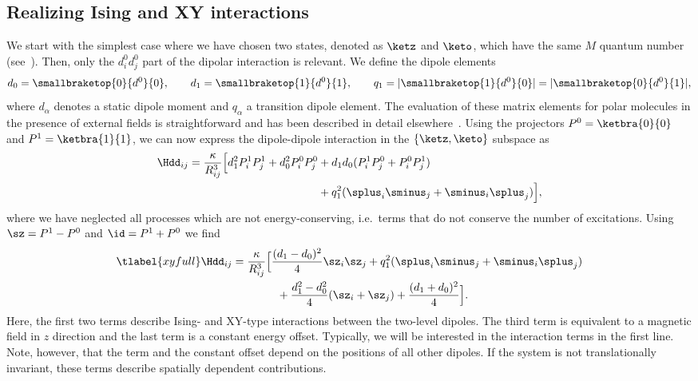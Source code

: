 \subsection{Realizing Ising and XY interactions}
We start with the simplest case where we have chosen two states, denoted as $\ketz$ and $\keto$, which have the same $M$ quantum number (see~).
Then, only the $d^0_id^0_j$ part of the dipolar interaction is relevant.
We define the dipole elements
\begin{align}
    d_0 = \smallbraketop{0}{d^0}{0},\qquad
    d_1 = \smallbraketop{1}{d^0}{1},\qquad
    q_1 = |\smallbraketop{1}{d^0}{0}| = |\smallbraketop{0}{d^0}{1}|,
\end{align}
where $d_\alpha$ denotes a static dipole moment and $q_\alpha$ a transition dipole element.
The evaluation of these matrix elements for polar molecules in the presence of external fields is straightforward and has been described in detail elsewhere~\cite{Micheli2007}.
Using the projectors $P^0 = \ketbra{0}{0}$ and $P^1 = \ketbra{1}{1}$, we can now express the
dipole-dipole interaction  in the $\{\ketz, \keto\}$ subspace as
\begin{align}
    \Hdd_{ij} = \frac{\kappa}{R_{ij}^3} \Big[ d_1^2 P^1_i P^1_j + d_0^2 P^0_i P^0_j &+ d_1d_0 (P^1_i P^0_j + P^0_i P^1_j) \\
              &+ q_1^2 (\splus_i \sminus_j + \sminus_i \splus_j) \Big],
\end{align}
where we have neglected all processes which are not energy-conserving,
i.e.~terms that do not conserve the number of excitations.
Using $\sz = P^1 - P^0$ and $\id = P^1 + P^0$ we find
\begin{align} \tlabel{xyfull}
    \Hdd_{ij} &= \frac{\kappa}{R_{ij}^3} \Big[ \frac{(d_1-d_0)^2}{4} \sz_i \sz_j  + q_1^2 (\splus_i \sminus_j + \sminus_i \splus_j)\\
              &\qquad\qquad + \frac{d_1^2 - d_0^2}{4} (\sz_i + \sz_j)  + \frac{(d_1+d_0)^2}{4} \Big].
\end{align}
Here, the first two terms describe Ising- and XY-type interactions between the two-level dipoles. The third term is equivalent to a magnetic field in $z$ direction and the last term is a constant energy offset. Typically, we will be interested in the interaction terms in the first line. Note, however, that the  term and the constant offset depend on the positions of all other dipoles. If the system is not translationally invariant, these terms
describe spatially dependent contributions.

